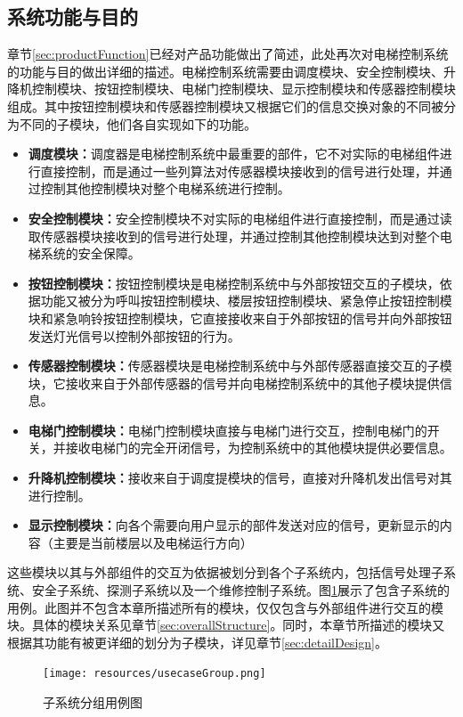 \subsection{系统功能与目的}
章节\ref{sec:productFunction}已经对产品功能做出了简述，此处再次对电梯控制系统的功能与目的做出详细的描述。电梯控制系统需要由调度模块、安全控制模块、升降机控制模块、按钮控制模块、电梯门控制模块、显示控制模块和传感器控制模块组成。其中按钮控制模块和传感器控制模块又根据它们的信息交换对象的不同被分为不同的子模块，他们各自实现如下的功能。\par
\begin{itemize}
	\item \textbf{调度模块：}调度器是电梯控制系统中最重要的部件，它不对实际的电梯组件进行直接控制，而是通过一些列算法对传感器模块接收到的信号进行处理，并通过控制其他控制模块对整个电梯系统进行控制。
	\item \textbf{安全控制模块：}安全控制模块不对实际的电梯组件进行直接控制，而是通过读取传感器模块接收到的信号进行处理，并通过控制其他控制模块达到对整个电梯系统的安全保障。
	\item \textbf{按钮控制模块：}按钮控制模块是电梯控制系统中与外部按钮交互的子模块，依据功能又被分为呼叫按钮控制模块、楼层按钮控制模块、紧急停止按钮控制模块和紧急响铃按钮控制模块，它直接接收来自于外部按钮的信号并向外部按钮发送灯光信号以控制外部按钮的行为。
	\item \textbf{传感器控制模块：}传感器模块是电梯控制系统中与外部传感器直接交互的子模块，它接收来自于外部传感器的信号并向电梯控制系统中的其他子模块提供信息。
	\item \textbf{电梯门控制模块：}电梯门控制模块直接与电梯门进行交互，控制电梯门的开关，并接收电梯门的完全开闭信号，为控制系统中的其他模块提供必要信息。
	\item \textbf{升降机控制模块：}接收来自于调度提模块的信号，直接对升降机发出信号对其进行控制。
	\item \textbf{显示控制模块：}向各个需要向用户显示的部件发送对应的信号，更新显示的内容（主要是当前楼层以及电梯运行方向）
\end{itemize}

这些模块以其与外部组件的交互为依据被划分到各个子系统内，包括信号处理子系统、安全子系统、探测子系统以及一个维修控制子系统。图\ref{fig:usecaseGroup}展示了包含子系统的用例。此图并不包含本章所描述所有的模块，仅仅包含与外部组件进行交互的模块。具体的模块关系见章节\ref{sec:overallStructure}。同时，本章节所描述的模块又根据其功能有被更详细的划分为子模块，详见章节\ref{sec:detailDesign}。
\begin{figure}[H]
	\centering
	\texttt{[image: resources/usecaseGroup.png]}
	\caption{子系统分组用例图}
	\label{fig:usecaseGroup}
\end{figure}

